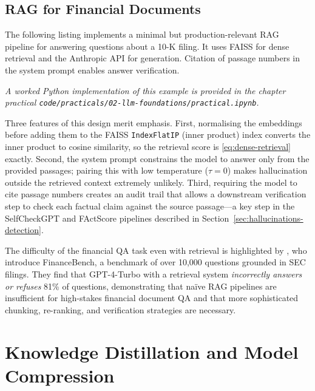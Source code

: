 \begin{context}
\subsection{RAG for Financial Documents}
\label{sec:rag-finance-foundations}

The following listing implements a minimal but production-relevant RAG pipeline for
answering questions about a 10-K filing.  It uses FAISS for dense retrieval and
the Anthropic API for generation.  Citation of passage numbers in the system prompt
enables answer verification.

\textit{A worked Python implementation of this example is provided in the chapter practical \texttt{code/practicals/02-llm-foundations/practical.ipynb}.}

Three features of this design merit emphasis.  First, normalising the embeddings
before adding them to the FAISS \texttt{IndexFlatIP} (inner product) index converts
the inner product to cosine similarity, so the retrieval score is \eqref{eq:dense-retrieval}
exactly.  Second, the system prompt constrains the model to answer only from the
provided passages; pairing this with low temperature ($\tau = 0$) makes hallucination
outside the retrieved context extremely unlikely.  Third, requiring the model to cite
passage numbers creates an audit trail that allows a downstream verification step to
check each factual claim against the source passage---a key step in the SelfCheckGPT
and FActScore pipelines described in Section~\ref{sec:hallucinations-detection}.

The difficulty of the financial QA task even with retrieval is highlighted by
\citet{zhang2024financebench}, who introduce FinanceBench, a benchmark of over 10,000
questions grounded in SEC filings.  They find that GPT-4-Turbo with a retrieval system
\emph{incorrectly answers or refuses} 81\% of questions, demonstrating that na\"ive
RAG pipelines are insufficient for high-stakes financial document QA and that more
sophisticated chunking, re-ranking, and verification strategies are necessary.

\end{context}
\section{Knowledge Distillation and Model Compression}
\label{sec:distillation}

